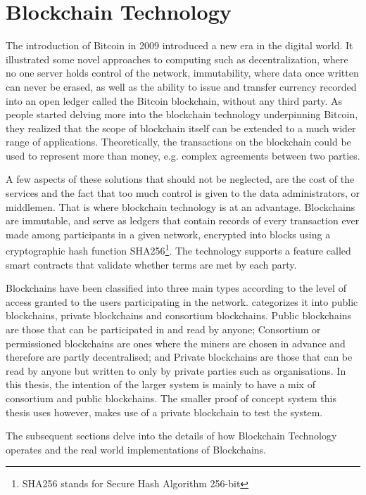 \documentclass[english]{tktltiki}
\begin{document}
\section{Blockchain Technology}

The introduction of Bitcoin \cite{bitcoin} in 2009 introduced a new era in the digital world. It illustrated some novel approaches to computing such as decentralization, where no one server holds control of the network, immutability, where data once written can never be erased, as well as the ability to issue and transfer currency recorded into an open ledger called the Bitcoin blockchain, without any third party. As people started delving more into the blockchain technology underpinning Bitcoin, they realized that the scope of blockchain itself can be extended to a much wider range of applications. Theoretically, the transactions on the blockchain could be used to represent more than money, e.g. complex agreements between two parties. 

A few aspects of these solutions that should not be neglected, are the cost of the services and the fact that too much control is given to the data administrators, or middlemen. That is where blockchain technology is at an advantage. Blockchains are immutable, and serve as ledgers that contain records of every transaction ever made among participants in a given network, encrypted into blocks using a cryptographic hash function SHA256\footnote{SHA256 stands for Secure Hash Algorithm 256-bit}. The technology supports a feature called smart contracts that validate whether terms are met by each party.

Blockchains have been classified into three main types according to the level of access granted to the users participating in the network. \cite{ethereum1} categorizes it into public blockchains, private blockchains and consortium blockchains. Public blockchains are those that can be participated in and read by anyone; Consortium or permissioned blockchains are ones where the miners are chosen in advance and therefore are partly decentralised; and Private blockchains are those that can be read by anyone but written to only by private parties such as organisations. In this thesis, the intention of the larger system is mainly to have a mix of consortium and public blockchains. The smaller proof of concept system this thesis uses however, makes use of a private blockchain to test the system.

The subsequent sections delve into the details of how Blockchain Technology operates and the real world implementations of Blockchains.
\end{document}
